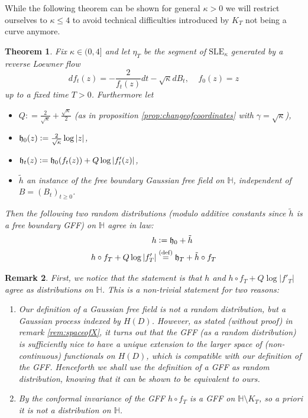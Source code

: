 \documentclass[11pt,reqno]{amsart}
\numberwithin{equation}{section}
\newtheorem{thm}{Theorem}[section]
\newtheorem{rem}[thm]{Remark}
\newcommand{\eqbydef}{\mathrel{\stackrel{\text{(def)}}{=}}}
\newcommand{\deq}{\mathrel{\mathop:}=}
\newcommand{\fh}{{\frak h}}
\begin{document}
While the following theorem can be shown for general $\kappa>0$ we will restrict ourselves to $\kappa\leq 4$ to avoid technical difficulties introduced by $K_T$ not being a curve anymore.

\begin{thm}
	Fix $\kappa\in (0,4]$ and let $\eta_T$ be the segment of $\text{SLE}_\kappa$ generated by a reverse Loewner flow $$df_t(z)=-\frac{2}{f_t(z)}dt-\sqrt\kappa dB_t, \;\;\;\; f_0(z)=z$$
	up to a fixed time $T>0$. Furthermore let \begin{itemize}
		\item $Q\deq\frac{2}{\sqrt\kappa}+\frac{\sqrt\kappa}{2}$ (as in proposition \ref{prop:changeofcoordinates} with $\gamma=\sqrt\kappa$),
		\item $\fh_0(z)\deq\frac{2}{\sqrt\kappa}\log|z|$,
		\item $\fh_t(z)\deq\fh_0(f_t(z))+Q\log|f'_t(z)|$,
		\item $\tilde h$ an instance of the free boundary Gaussian free field on $\mathbb H$, independent of $B=(B_t)_{t\geq 0}$.
	\end{itemize}
	Then the following two random distributions (modulo additive constants since $\tilde h$ is a \emph{free boundary} GFF) on $\mathbb H$ agree in law:
	\begin{align*}
		h&\deq \fh_0+\tilde h\\
		h\circ f_T+Q\log|f'_T|&\eqbydef\fh_T+\tilde h\circ f_T
	\end{align*}
\end{thm}
\begin{rem}
	First, we notice that the statement is that $h$ and $h\circ f_T+Q\log|f'_T|$ agree as distributions on $\mathbb H$. This is a non-trivial statement for two reasons:
	\begin{enumerate}
		\item Our definition of a Gaussian free field is not a random distribution, but a Gaussian process indexed by $H(D)$. However, as stated (without proof) in remark \ref{rem:spaceofX}, it turns out that the GFF (as a random distribution) is sufficiently nice to have a unique extension to the larger space of (non-continuous) functionals on $H(D)$, which is compatible with our definition of the GFF. Henceforth we shall use the definition of a GFF as random distribution, knowing that it can be shown to be equivalent to ours.
		\item By the conformal invariance of the GFF $h\circ f_T$ is a GFF on $\mathbb H\setminus K_T$, so a priori it is not a distribution on $\mathbb H$. 
	\end{enumerate}
\end{rem}
\end{document}
